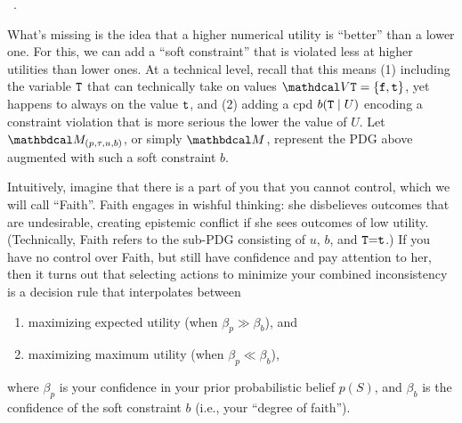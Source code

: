 \documentclass{article} %
\theoremstyle{plain}
\theoremstyle{definition}
\theoremstyle{remark}
\begin{document}
\begin{center}
   ~.
\end{center}

What's missing is the idea 
that a higher numerical utility is ``better'' than a lower one. 
For this, we can add a ``soft constraint'' \citep[see][\S4.2.2]{oli-dissertation} that is violated less at higher utilities than lower ones.
At a technical level, recall that this means 
(1) including the variable ${\tt T}$ that can technically take on values $\V \Tru = \{ \truf, \trut\}$, yet happens to always on the value ${\tt t}$,
and  
(2) adding a cpd $b({\tt T} \mid U)$ encoding a constraint violation that is more serious the lower the value of $U$. 
Let 
$\dg M_{(p, \tau, u, b)}$, or simply $\dg M$, 
represent the PDG above augmented with such a soft constraint $b$. 

Intuitively, imagine that there is a part of you that you cannot control, 
   which we will call ``Faith''.
Faith
   engages in wishful thinking: 
   she disbelieves outcomes that are undesirable,
   creating epistemic conflict if she sees outcomes of low utility. 
(Technically, Faith refers to the sub-PDG consisting of $u$, $b$, and ${\tt T}{=}{\tt t}$.)
If you have no control over Faith, but still have confidence and pay attention to her,
then it turns out that selecting actions to minimize your combined inconsistency
is a decision rule that interpolates between
\begin{enumerate}[nosep,label={(\alph*)}]
   \item 
   maximizing expected utility (when $\beta_p \gg \beta_b$), and
   \item 
   maximizing maximum utility (when $\beta_p \ll \beta_b$),
\end{enumerate}
where  $\beta_p$ is your confidence in your prior probabilistic belief $p(S)$, and $\beta_b$ is the confidence of the soft constraint $b$ (i.e., your ``degree of faith'').
\end{document}
